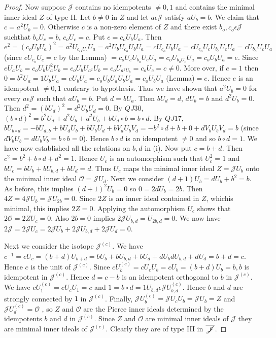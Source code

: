 \begin{proof}
Now suppose $\mathscr{J}$ contains no idempotents $\neq 0,1$ and
contains the minimal inner ideal $Z$ of type II. Let
$b\neq  0$ in $Z$ and let $a\epsilon \mathscr{J}$ satisfy
$aU_b=b$. We claim that $c=a^{2}U_b=0$. Otherwise $c$ is a non-zero
element of $Z$ and there exist $b_o,c_o\epsilon
\mathscr{J}$ suchthat $b_oU_c=b$, $c_oU_c=c$. Put $e=c_oU_bU_a$. Then
$e^{2}=(c_oU_bU_a)^{2}=a^{2}U_{c_OU_b}U_a=a^{2}U_bU_{c_{o}}U_bU_a=cU_{c_o}U_bU_a=cU_{c_o}
U_cU_{b_o}U_cU_a=cU_{b_o}U_cU_a$
(since $cU_{c_o}U_c=c$ by the Lemma)
$=c_oU_cU_{b_o}U_cU_a=c_oU_{b_oU_c}U_a=c_oU_bU_a=e$. Since
$eU_aU_b=c_oU_bU^{2}_aU_b=c_oU_bU_{a^{2}}U_b=c_oU_{a^{2}U_b}=c_oU_c=c\neq0$. More
over, if $e=1$ then
$0=b^{2}U_a=1U_bU_a=eU_bU_a=c_oU_bU_aU_bU_a=c_oU_bU_a$
(Lemma)$=e$. Hence $e$ is an idempotent $\neq 0,1$ contrary to
hypothesis. Thus we have shown that $a^{2}U_b=0$ for every $a\epsilon
\mathscr{J}$ such that $aU_b=b$. Put $d=bU_a$. Then $bU_d=d$, $dU_b=b$
and $d^{2}U_b=0$. Then $d^{2}=(bU_d)^{2}=d^{2}U_bU_d=0$. By $QJ 30$,
$(b\circ d)^{2}=b^{2}U_d+d^{2}U_b+d^{2}U_b+bU_d\circ b= b\circ d$. By
$QJ 17$, $bU_{b\circ
  d}=-bU_{d,b}+bU_dU_b+bU_bU_d+bV_aU_bV_d=-b^{2}\circ d+
b+0+dV_bU_bV_d=b$ (since $dV_bU_b=dU_bV_b=b\circ b=0$). Hence $b\circ
d$ is an idempotent $\neq 0$ and so $b\circ d=1$. We have now
established all the relations on $b,d$ in (i). Now put $c=b+d$. Then
$c^{2}=b^{2}+b\circ d+d^{2}=1$. Hence $U_c$ is an automorphism such
that $U^{2}_c=1$ and $bU_c=bU_b+bU_{b,d}+ bU_d=d$. Thus $U_c$ maps the
minimal inner ideal $Z=\mathscr{J}U_b$ onto the minimal
inner ideal $\mathscr{O}=\mathscr{J} U_d$. Next we consider
$(d+1)U_b=dU_b+b^{2}=b$. As before, this implies $(d+1)^{2}U_b=0$ so
$0=2dU_b=2b$. Then $4Z=4\mathscr{J} U_b=\mathscr{J}
U_{2b}=0$. Since $2Z$ is an inner ideal contained in
$Z$, which\pageoriginale is minimal, this implies
$2Z=0$. Applying the automorphism $U_c$ shows that
$2\mathscr{O}=2ZU_c=0$. Also $2b=0$ implies
$2\mathscr{J}U_{b,d}=U_{2b,d}=0$. We now have
$2\mathscr{J}=2\mathscr{J}U_c=2\mathscr{J}U_b+2\mathscr{J}U_{b,d}+2\mathscr{J}U_d=0$.

Next we consider the isotope $\mathscr{J}^{(c)}$. We have
$c^{-1}=cU_c=(b+d)U_{b+d}=bU_b+bU_{b,d}+bU_d+dU_bdU_{b,d}+dU_d=b+d=c$. Hence
$c$ is the unit of $\mathscr{J}^{(c)}$. Since
$cU^{(c)}_b=cU_cU_b=cU_b=(b+d)U_b=b,b$ is idempotent in
$\mathscr{J}^{(c)}$. Hence $d=c-b$ is an idempotent orthogonal to $b$
in $\mathscr{J}^{(c)}$. We have $cU^{(c)}_1=cU_cU_1=c$ and $1=b\circ
d=1U_{b,d}\epsilon \mathscr{J}U_{b,d}^{(c)}$. Hence $b$ and $d$ are
strongly connected by $1$ in $\mathscr{J}^{(c)}$. Finally,
$\mathscr{J}U^{(c)}_b=\mathscr{J}U_cU_b=\mathscr{J}U_b=Z$
and $\mathscr{J}U^{(c)}_d=\mathscr{O}$ , so $Z$ and
$\mathscr{O}$ are the Pierce inner ideals determined by the idempotents
$b$ and $d$ in $\mathscr{J}^{(c)}$. Since $Z$ and
$\mathscr{O}$ are minimal inner ideals of $\mathscr{J}$ they are
minimal inner ideals of $\mathscr{J}^{(c)}$. Clearly they are of type
III in $\overline{\mathscr{J}}$.


\end{proof}
